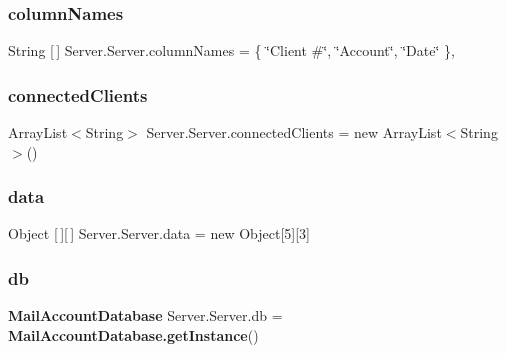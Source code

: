 \subsubsection{column\+Names}
{\footnotesize\ttfamily String [$\,$] Server.\+Server.\+column\+Names = \{ \char`\"{}Client \#\char`\"{}, \char`\"{}Account\char`\"{}, \char`\"{}Date\char`\"{} \}\hspace{0.3cm}{\ttfamily [static]}, {\ttfamily [package]}}

\mbox{\label{class_server_1_1_server_a2684f5e5a2c95c6fd8204976e9fe5622}} 
\subsubsection{connected\+Clients}
{\footnotesize\ttfamily Array\+List$<$String$>$ Server.\+Server.\+connected\+Clients = new Array\+List$<$String$>$()\hspace{0.3cm}{\ttfamily [static]}}

\mbox{\label{class_server_1_1_server_af7d4799bec30f3458413978a69478709}} 
\subsubsection{data}
{\footnotesize\ttfamily Object [$\,$][$\,$] Server.\+Server.\+data = new Object[5][3]\hspace{0.3cm}{\ttfamily [static]}}

\mbox{\label{class_server_1_1_server_af900d61239ceb2b759ba255c1184df24}} 
\subsubsection{db}
{\footnotesize\ttfamily \textbf{ Mail\+Account\+Database} Server.\+Server.\+db = \textbf{ Mail\+Account\+Database.\+get\+Instance}()\hspace{0.3cm}{\ttfamily [static]}}

\mbox{\label{class_server_1_1_server_a88837412ac2c805ab1cc75ad7fe37ac6}} 
